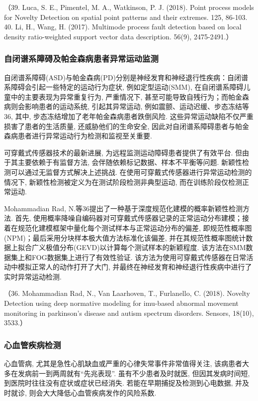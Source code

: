 \documentclass{Style/aas}
\begin{document}
\begin{multicols}{2}
  （39.	Luca, S. E., Pimentel, M. A., Watkinson, P. J. (2018). Point process models for Novelty Detection on spatial point patterns and their extremes. 125, 86-103.
  40.	Li, H., Wang, H. (2017). Multimode process fault detection based on local density ratio-weighted support vector data description. 56(9), 2475-2491.）

  \subsubsection{自闭谱系障碍及帕金森病患者异常运动监测}
  自闭谱系障碍(ASD)与帕金森病(PD)分别是神经发育和神经退行性疾病：自闭谱系障碍会引起一些特定的运动行为症状, 例如定型运动(SMM), 在自闭谱系障碍儿童中的主要表现为异常重复行为, 严重情况下, 甚至可能导致自残行为；而帕金森病则会影响患者的运动系统, 引起其异常运动, 例如震颤、运动迟缓、步态冻结等36, 其中, 步态冻结增加了老年帕金森病患者跌倒风险. 这些异常运动缺陷不仅严重损害了患者的生活质量, 还威胁他们的生命安全, 因此对自闭谱系障碍患者与帕金森病患者进行异常运动行为检测和监视至关重要.

  可穿戴式传感器技术的最新进展, 为远程监测运动障碍患者提供了有效平台. 但由于其主要依赖于有监督方法, 会伴随依赖标记数据、样本不平衡等问题. 新颖性检测可以通过无监督方式解决上述挑战. 在使用可穿戴式传感器进行异常运动检测的情况下, 新颖性检测被定义为在测试阶段检测非典型运动, 而在训练阶段仅检测正常运动.

  Mohammadian Rad, N.等36提出了一种基于深度规范化建模的概率新颖性检测方法. 首先, 使用概率降噪自编码器对可穿戴式传感器记录的正常运动分布建模；接着在规范化建模框架中量化每个测试样本与正常运动分布的偏差, 即规范性概率图(NPM)；最后采用分块样本极大值方法标准化该偏差, 并在其规范性概率图统计数据上拟合广义极值分布(GEVD)以计算每个测试样本的新颖程度. 该方法在SMM数据集上和FOG数据集上进行了有效性验证. 该方法为使用可穿戴式传感器在日常活动中模拟正常人的动作打开了大门, 并最终在神经发育和神经退行性疾病中进行了实时异常运动检测.

  （36.	Mohammadian Rad, N., Van Laarhoven, T., Furlanello, C. (2018). Novelty Detection using deep normative modeling for imu-based abnormal movement monitoring in parkinson’s disease and autism spectrum disorders. Sensors, 18(10), 3533.）

  \subsubsection{心血管疾病检测}
  心血管病, 尤其是急性心肌缺血或严重的心律失常事件非常值得关注, 该病患者大多在发病前一到两周就有“先兆表现”. 虽有不少患者及时就医, 但因其发病时间短, 到医院时往往没有症状或症状已经消失. 若能在早期捕捉及检测到心电数据, 并及时就诊, 则会大大降低心血管疾病发作的风险系数.


\end{multicols}
\end{document}

